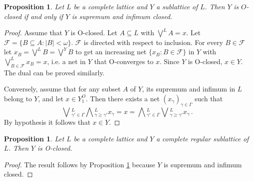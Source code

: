 \documentclass[12pt,a4paper]{amsart}
\numberwithin{equation}{section}
\newtheorem{prop}[thm]{Proposition}
\theoremstyle{definition}
\newcommand{\sss}[1]{{\scriptscriptstyle #1}}
\newcommand{\lbigvee}[1]{\bigvee^{\scriptscriptstyle #1}}
\begin{document}
\begin{prop}\label{35}
	Let $L$ be a complete lattice and $Y$ a sublattice of $L$. Then $Y$ is $O$-closed if and only if $Y$ is supremum and infimum closed.
\end{prop}

\begin{proof}
	Assume that $Y$ is O-closed. Let $A \subseteq L$ with $\lbigvee{L} A = x$. Let $\mathscr{F} = \{B \subseteq A : \vert B \vert < \omega \}$.  $\mathscr{F}$ is directed with respect to inclusion. For every $B \in \mathscr{F}$ let $x_{B} = \lbigvee{L}B=\lbigvee{Y}B$ to get an increasing net $\{x_{B} : B\in \mathscr{F} \}$ in $Y$ with $\lbigvee{L}_{B\in\mathscr F}x_{B} = x$, i.e. a net in $Y$ that O-converges to $x$.  Since $Y$ is O-closed,  $x \in Y$. The dual can be proved similarly.
		
	Conversely, assume that for any subset $A$ of $Y$, its supremum and infimum in $L$ belong to $Y$, and let $x \in Y^{\sss O}_{1}$. Then there exists a net $(x_{\gamma})_{\gamma \in \Gamma}$ such that
	\begin{equation*}
		\bigvee{}^{\!L}_{\gamma'\in\Gamma}\bigwedge{}^{\!L}_{\gamma\ge \gamma'} x_{\gamma} = x = 	\bigwedge{}^{\!L}_{\gamma'\in\Gamma}\bigvee{}^{\!L}_{\gamma\ge \gamma'}x_\gamma\,.
	\end{equation*}
	By hypothesis it follows that $x \in Y$.
\end{proof}

\medskip

\begin{prop}\label{36}
	Let $L$ be a complete lattice and $Y$ a complete regular sublattice of $L$. Then $Y$ is O-closed.
\end{prop}
\begin{proof}
	The result follows by Proposition \ref{35} because $Y$ is supremum and infimum closed.
\end{proof}	
\end{document}
